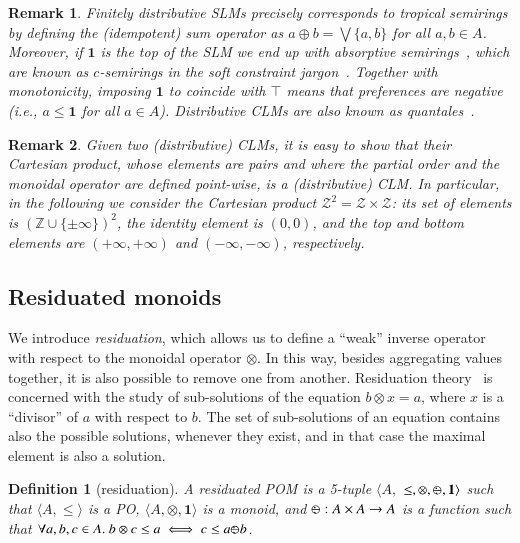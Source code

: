 \documentclass[a4paper]{elsarticle}
\newtheorem{definition}{Definition}
\newtheorem{remark}{Remark}
\newcommand{\1}{\mathbf{1}}
\def\odiv{{ \ominus\hspace{-8pt}:}\;}
\begin{document}
\begin{remark}\label{remTrop}
	Finitely distributive SLMs precisely corresponds to \emph{tropical} semirings 
	by defining the (idempotent) sum operator as
	$a \oplus b = \bigvee \{a, b\}$ for all $a,b \in A$.
	Moreover, if $\1$ is the top of the SLM we end up 
	with \emph{absorptive} semirings~\cite{golan}, 
	which are known as $c$-semirings 
	in the soft constraint jargon~\cite{jacm97}.
	Together with monotonicity, imposing $\1$ to coincide with $\top$ means 
	that preferences are negative (i.e., $a \leq \1$ for all $a \in A$).
	Distributive CLMs are also known as \emph{quantales}~\cite{quantales}.
\end{remark}

\begin{remark}
	\label{remark}
	Given two (distributive) CLMs, it is easy to show that their Cartesian product, whose elements are pairs and where the partial order and the monoidal operator are 
	defined point-wise, is a (distributive) CLM.
	In particular, in the following we consider the Cartesian product $\mathcal{Z}^2 = \mathcal{Z} \times \mathcal{Z}$:
	its set of
	elements is $(\mathbb{Z} \cup \{\pm \infty\})^2$, the identity element is $(0,0)$,
	and the top and bottom elements are $(+\infty, +\infty)$ and $(-\infty, -\infty)$, respectively.
\end{remark}

\subsection{Residuated monoids}

We introduce \emph{residuation}, which allows us to define a ``weak'' inverse 
operator with respect to the monoidal operator $\otimes$. 
In this way, besides aggregating values together, it is also possible to remove one from 
another. Residuation theory~\cite{golan} is concerned with the study of sub-solutions of the 
equation $b \otimes x = a$, where $x$ is a ``divisor'' of $a$ with respect to $b$. 
The set of sub-solutions of an equation contains also the 
possible solutions, whenever they exist, and in that case the maximal element is also a 
solution.

\begin{definition}[residuation]
	A residuated POM is a 5-tuple $\langle A,$ $\leq, \otimes,  \odiv, \1 \rangle$ such that
	$\langle A, \leq \rangle$ is a PO,  $\langle A, \otimes, \1 \rangle$ is a monoid, and
	$\odiv: A \times A \rightarrow A$ is a function such that $\forall a, b, c \in A.\ b \otimes c \leq a \iff c \leq a \odiv b$.
\end{definition}
\end{document}
